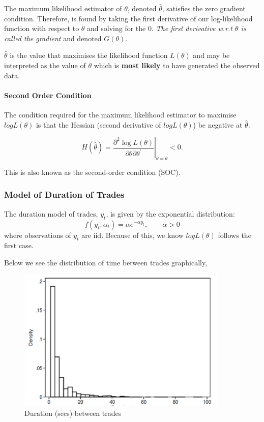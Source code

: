 \documentclass[11pt]{article}
\begin{document}
The maximum likelihood estimator of $\theta$, denoted $\hat{\theta}$, satisfies the zero gradient condition. Therefore, is found by taking the first derivative of our log-likelihood function with respect to $\theta$ and solving for the 0. \textit{The first derivative w.r.t $\theta$ is called the gradient} and denoted $G(\theta)$.

$\hat{\theta}$ is the value that maximises the likelihood function $L(\theta)$ and may be interpreted as the value of $\theta$ which is \textbf{most likely} to have generated the observed data. 

\paragraph{Second Order Condition} \mbox{}

The condition required for the maximum likelihood estimator to maximise $log L(\theta)$ is that the Hessian (second derivative of $log L(\theta)$) be negative at $\hat{\theta}$.

\begin{equation}
H(\widehat{\theta})=\left.\frac{\partial^2 \log L(\theta)}{\partial \theta \partial \theta^{\prime}}\right|_{\theta=\widehat{\theta}}<0 .
\end{equation}

This is also known as the second-order condition (SOC).

\subsubsection{Model of Duration of Trades}

The duration model of trades, $y_t$, is given by the exponential distribution:
\[f(y_t;\alpha_t) = \alpha e^{-\alpha y_t}, \qquad \alpha>0\]
where observations of $y_t$ are iid. Because of this, we know $log L(\theta)$ follows the first case.

Below we see the distribution of time between trades graphically,
\begin{figure}[h]
    \centering
    \includegraphics[width=10cm]{pics/duration between trades.png}
    \caption{Duration (secs) between trades}
    \label{fig:duration between trades}
\end{figure}
\end{document}
